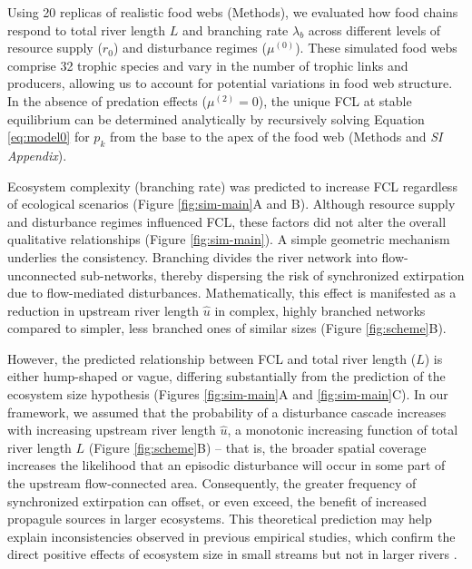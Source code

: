 \documentclass[11pt, class=article, crop=false]{standalone}
\begin{document}


Using 20 replicas of realistic food webs (Methods), we evaluated how food chains respond to total river length $L$ and branching rate $\lambda_b$ across different levels of resource supply ($r_0$) and disturbance regimes ($\mu^{(0)}$).
These simulated food webs comprise 32 trophic species and vary in the number of trophic links and producers, allowing us to account for potential variations in food web structure.
In the absence of predation effects ($\mu^{(2)} = 0$), the unique FCL at stable equilibrium can be determined analytically by recursively solving Equation \ref{eq:model0} for $p_k$ from the base to the apex of the food web (Methods and \textit{SI Appendix}).

Ecosystem complexity (branching rate) was predicted to increase FCL regardless of ecological scenarios (Figure \ref{fig:sim-main}A and B).
Although resource supply and disturbance regimes influenced FCL, these factors did not alter the overall qualitative relationships (Figure \ref{fig:sim-main}).
A simple geometric mechanism underlies the consistency.
Branching divides the river network into flow-unconnected sub-networks, thereby dispersing the risk of synchronized extirpation due to flow-mediated disturbances.
Mathematically, this effect is manifested as a reduction in upstream river length $\hat{u}$ in complex, highly branched networks compared to simpler, less branched ones of similar sizes (Figure \ref{fig:scheme}B).

However, the predicted relationship between FCL and total river length ($L$) is either hump-shaped or vague, differing substantially from the prediction of the ecosystem size hypothesis (Figures \ref{fig:sim-main}A and \ref{fig:sim-main}C).
In our framework, we assumed that the probability of a disturbance cascade increases with increasing upstream river length $\hat{u}$, a monotonic increasing function of total river length $L$ (Figure \ref{fig:scheme}B) -- that is, the broader spatial coverage increases the likelihood that an episodic disturbance will occur in some part of the upstream flow-connected area.
Consequently, the greater frequency of synchronized extirpation can offset, or even exceed, the benefit of increased propagule sources in larger ecosystems.
This theoretical prediction may help explain inconsistencies observed in previous empirical studies, which confirm the direct positive effects of ecosystem size in small streams \citep{mchugh_dual_2010, mcintosh_capacity_2018} but not in larger rivers \citep{sabo_role_2010, warfe_productivity_2013}.
\end{document}
